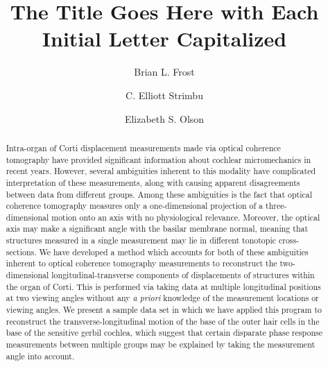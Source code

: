\documentclass[aip,cp,amsmath,amssymb,reprint]{revtex4-2}
\begin{document}
\title{The Title Goes Here with Each Initial Letter Capitalized}%
\author{Brian L. Frost} %
\author{C. Elliott Strimbu}%

\author{Elizabeth S. Olson}


\begin{abstract}
	Intra-organ of Corti displacement measurements made via optical coherence tomography have provided significant information about cochlear micromechanics in recent years. However, several ambiguities inherent to this modality have complicated interpretation of these measurements, along with causing apparent disagreements between data from different groups. Among these ambiguities is the fact that optical coherence tomography measures only a one-dimensional projection of a three-dimensional motion onto an axis with no physiological relevance. Moreover, the optical axis may make a significant angle with the basilar membrane normal, meaning that structures measured in a single measurement may lie in different tonotopic cross-sections. We have developed a method which accounts for both of these ambiguities inherent to optical coherence tomography measurements to reconstruct the two-dimensional longitudinal-transverse components of displacements of structures within the organ of Corti. This is performed via taking data at multiple longitudinal positions at two viewing angles without any \textit{a priori} knowledge of the measurement locations or viewing angles. We present a sample data set in which we have applied this program to reconstruct the transverse-longitudinal motion of the base of the outer hair cells in the base of the sensitive gerbil cochlea, which suggest that certain disparate phase response measurements between multiple groups may be explained by taking the measurement angle into account.
\end{abstract}
\end{document}

